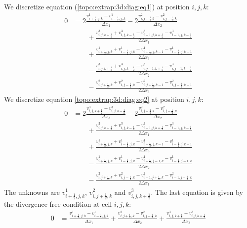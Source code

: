 We discretize equation (\ref{topo:extrap:3d:diag:eq1}) at position $i,j,k$:
\begin{equation}\label{extrap:3d:3:eq3}
 \begin{split}
	0&=2\frac{v^{1}_{i+\frac{1}{2},j,k}-v^{1}_{i-\frac{1}{2},j,k}}{\Delta x_1}-2\frac{v^{2}_{i,j+\frac{1}{2}.k}-v^{2}_{i,j-\frac{1}{2},k}}{\Delta x_2}\\
	&\qquad +\frac{v^{3}_{i,j,k+\frac{1}{2}}+v^{3}_{i,j,k-\frac{1}{2}}-v^{3}_{i-1,j,k+\frac{1}{2}}-v^{3}_{i-1,j,k-\frac{1}{2}}}{2\Delta x_1}\\
	&\qquad +\frac{v^{1}_{i+\frac{1}{2},j,k}+v^1_{i-\frac{1}{2},j,k}-v^{1}_{i+\frac{1}{2},j,k-1}-v^{1}_{i-\frac{1}{2},j,k-1}}{2\Delta x_3}\\
	&\qquad -\frac{v^{3}_{i,j,k+\frac{1}{2}}+v^{3}_{i,j,k-\frac{1}{2}}-v^{3}_{i,j-1,k+\frac{1}{2}}-v^{3}_{i,j-1,k-\frac{1}{2}}}{2\Delta x_2}\\
	&\qquad -\frac{v^{2}_{i,j+\frac{1}{2},k}+v^2_{i,j-\frac{1}{2},k}-v^{2}_{i,j+\frac{1}{2},k-1}-v^{2}_{i,j-\frac{1}{2},k-1}}{2\Delta x_3}
\end{split}
	\end{equation}
We discretize equation \ref{topo:extrap:3d:diag:eq2} at position $i,j,k$:
\begin{equation}\label{extrap:3d:3:eq2}
 \begin{split}
	0&=2\frac{v^{3}_{i,j,k+\frac{1}{2}}-v^{3}_{i,j,k-\frac{1}{2}}}{\Delta x_3}-2\frac{v^{2}_{i,j+\frac{1}{2}.k}-v^{2}_{i,j-\frac{1}{2},k}}{\Delta x_2}\\
	&\qquad +\frac{v^{3}_{i,j,k+\frac{1}{2}}+v^{3}_{i,j,k-\frac{1}{2}}-v^{3}_{i-1,j,k+\frac{1}{2}}-v^{3}_{i-1,j,k-\frac{1}{2}}}{2\Delta x_1}\\
	&\qquad +\frac{v^{1}_{i+\frac{1}{2},j,k}+v^1_{i-\frac{1}{2},j,k}-v^{1}_{i+\frac{1}{2},j,k-1}-v^{1}_{i-\frac{1}{2},j,k-1}}{2\Delta x_3}\\
	&\qquad -\frac{v^{1}_{i+\frac{1}{2},j,k}+v^{1}_{i-\frac{1}{2},j,k}-v^{1}_{i+\frac{1}{2},j-1,k}-v^{1}_{i-\frac{1}{2},j-1,k}}{2\Delta x_2}\\
	&\qquad -\frac{v^{2}_{i,j+\frac{1}{2},k}+v^2_{i,j-\frac{1}{2},k}-v^{2}_{i-1,j+\frac{1}{2},k}-v^{2}_{i-1,j-\frac{1}{2},k}}{2\Delta x_1}
\end{split}
	\end{equation}
The unknowns are $v^{1}_{i+\frac{1}{2},j,k}$, $v^2_{i,j+\frac{1}{2},k}$ and $v^{3}_{i,j,k+\frac{1}{2}}$.
The last equation is given by the divergence free condition at cell $i,j,k$:
\begin{align}\label{extrap:3d:3:div}
 0&=\frac{v^{1}_{i+\frac{1}{2},j,k}-v^{1}_{i-\frac{1}{2},j,k}}{\Delta x_1}+\frac{v^{2}_{i,j+\frac{1}{2},k}-v^{2}_{i,j-\frac{1}{2},k}}{\Delta x_2}+\frac{v^{3}_{i,j,k+\frac{1}{2}}-v^{3}_{i,j,k+\frac{1}{2}}}{\Delta x_3}
\end{align}
